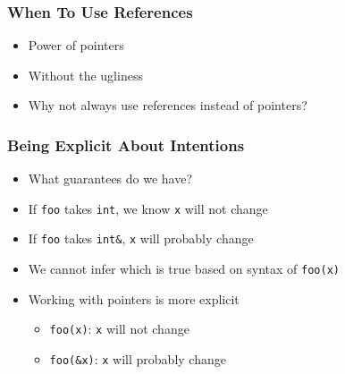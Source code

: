 \begin{frame}
  \frametitle{When To Use References}
  \begin{itemize}
    \item Power of pointers
    \item Without the ugliness
    \item Why not always use references instead of pointers?
  \end{itemize}
\end{frame}

\begin{frame}
  \frametitle{Being Explicit About Intentions}
  \begin{itemize}
    \item What guarantees do we have?
    \item If {\tt foo} takes {\tt int}, we know {\tt x} will not change
    \item If {\tt foo} takes {\tt int\&}, {\tt x} will probably change
    \item We cannot infer which is true based on syntax of {\tt foo(x)}
    \item Working with pointers is more explicit
          \begin{itemize}
            \item {\tt foo(x)}: {\tt x} will not change
            \item {\tt foo(\&x)}: {\tt x} will probably change
          \end{itemize}
  \end{itemize}
\end{frame}

